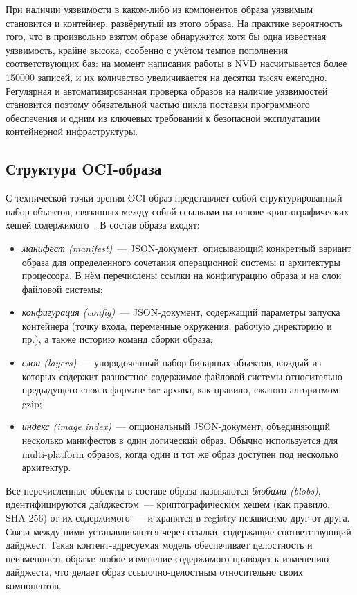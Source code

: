 При наличии уязвимости в каком-либо из компонентов образа уязвимым становится и контейнер, развёрнутый из этого образа. На практике вероятность того, что в произвольно взятом образе обнаружится хотя бы одна известная уязвимость, крайне высока, особенно с учётом темпов пополнения соответствующих баз: на момент написания работы в NVD насчитывается более 150000 записей, и их количество увеличивается на десятки тысяч ежегодно. Регулярная и автоматизированная проверка образов на наличие уязвимостей становится поэтому обязательной частью цикла поставки программного обеспечения и одним из ключевых требований к безопасной эксплуатации контейнерной инфраструктуры.

\subsection{Структура OCI-образа}
\label{subsec:oci-structure}

С технической точки зрения OCI-образ представляет собой структурированный набор объектов, связанных между собой ссылками на основе криптографических хешей содержимого~\cite{oci}. В состав образа входят:

\begin{itemize}
\item \textit{манифест (manifest)}~--- JSON-документ, описывающий конкретный вариант образа для определенного сочетания операционной системы и архитектуры процессора. В нём перечислены ссылки на конфигурацию образа и на слои файловой системы;
\item \textit{конфигурация (config)}~--- JSON-документ, содержащий параметры запуска контейнера (точку входа, переменные окружения, рабочую директорию и пр.), а также историю команд сборки образа;
\item \textit{слои (layers)}~--- упорядоченный набор бинарных объектов, каждый из которых содержит разностное содержимое файловой системы относительно предыдущего слоя в формате tar-архива, как правило, сжатого алгоритмом gzip;
\item \textit{индекс (image index)}~--- опциональный JSON-документ, объединяющий несколько манифестов в один логический образ. Обычно используется для multi-platform образов, когда один и тот же образ доступен под несколько архитектур.
\end{itemize}

Все перечисленные объекты в составе образа называются \textit{блобами (blobs)}, идентифицируются дайджестом~--- криптографическим хешем (как правило, SHA-256) от их содержимого~--- и хранятся в registry независимо друг от друга. Связи между ними устанавливаются через ссылки, содержащие соответствующий дайджест. Такая контент-адресуемая модель обеспечивает целостность и неизменность образа: любое изменение содержимого приводит к изменению дайджеста, что делает образ ссылочно-целостным относительно своих компонентов.

